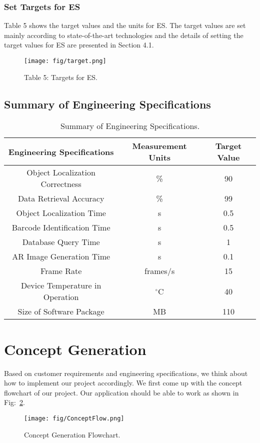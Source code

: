 \documentclass[11pt,a4paper]{article}
\begin{document}
\begin{onehalfspace}
\subsubsection{Set Targets for ES}

Table 5 shows the target values and the units for ES. The target values are set mainly according to state-of-the-art technologies and the details of setting the target values for ES are presented in Section 4.1.

\begin{figure}[H]
    \centering
    \caption*{Table 5: Targets for ES.}
    \texttt{[image: fig/target.png]}
    \label{fig:target}
\end{figure}

\subsection{Summary of Engineering Specifications}

\setcounter{table}{5}
\begin{table}[H]
    \centering
    \caption{Summary of Engineering Specifications.}
    \begin{tabular}{|c|c|c|}
        \hline
        \textbf{Engineering Specifications} & \textbf{Measurement Units} & \textbf{Target Value} \\
        \hline
        Object Localization Correctness & \%	& 90 \\
        \hline
        Data Retrieval Accuracy & \% & 99 \\
        \hline
        Object Localization Time & s & 0.5\\
        \hline
        Barcode Identification Time & s & 0.5 \\
        \hline
        Database Query Time & s & 1\\
        \hline
        AR Image Generation Time & s & 0.1 \\
        \hline
        Frame Rate & frames/s & 15	\\
        \hline
        Device Temperature in Operation & $^\circ$C &  40	\\
        \hline
        Size of Software Package & MB & 110\\
        \hline
    \end{tabular} \label{tab:es}
\end{table}





\section{Concept Generation}
Based on customer requirements and engineering specifications, we think about how to implement our project accordingly. We first come up with the concept flowchart of our project. Our application should be able to work as shown in Fig:~\ref{concept flowchart}.
\begin{figure}[H]
	\centering
	\texttt{[image: fig/ConceptFlow.png]}
	\caption{Concept Generation Flowchart.}
	\label{concept flowchart}
\end{figure}


\end{onehalfspace}
\end{document}
